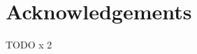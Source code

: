 \documentclass[12pt]{report}
\begin{document}
	\setlength{\parindent}{1.5em}

	\newpage
	
	\doublespacing
	

	
	\chapter*{Acknowledgements}
	 TODO x 2
	\clearpage
	
	\tableofcontents
	\listoffigures
	\listoftables
	
	\clearpage

	\setcounter{page}{1}
	
    
	
	
	
	
	
	\singlespacing
	\nocite{*}
	
	

	
	
	
\end{document}
